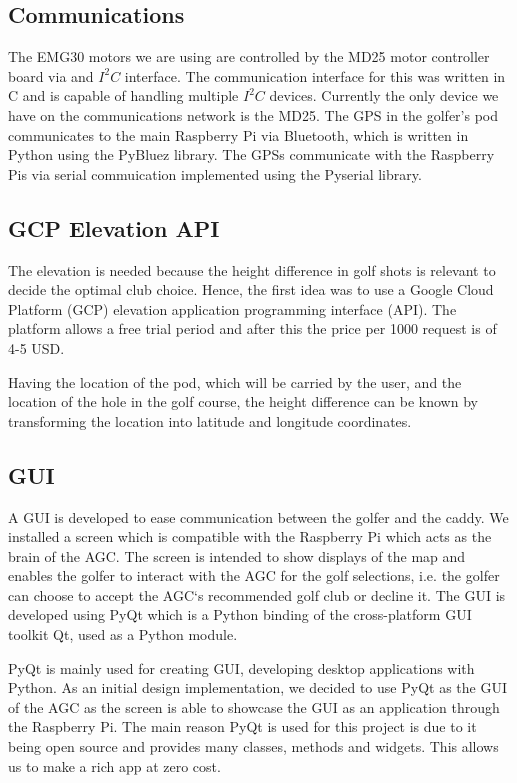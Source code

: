 \documentclass[11pt,landscape]{article}
\begin{document}
\begin{multicols}{3}

\subsection{Communications}
The EMG30 motors we are using are controlled by the MD25 motor controller board
via and $I^2C$ interface. The communication interface for this was written in C
and is capable of handling multiple $I^2C$ devices. Currently the only device we
have on the communications network is the MD25. The GPS in the golfer's pod communicates to the main Raspberry Pi via Bluetooth,
which is written in Python using the PyBluez library. The GPSs communicate with
the Raspberry Pis via serial commuication implemented using the Pyserial
library.

\subsection{GCP Elevation API}
The elevation is needed because the height difference in golf shots is relevant
to decide the optimal club choice. Hence, the first idea was to use a Google
Cloud Platform (GCP) elevation application programming interface (API). The
platform allows a free trial period and after this the price per 1000 request is
of 4-5 USD. 

Having the location of the pod, which will be carried by the user, and the
location of the hole in the golf course, the height difference can be known by
transforming the location into latitude and longitude coordinates.


\subsection{GUI}

A GUI is developed to ease communication between the golfer and the caddy. We
installed a screen which is compatible with the Raspberry Pi which acts as the
brain of the AGC. The screen is intended to show displays of the map and enables
the golfer to interact with the AGC for the golf selections, i.e. the golfer can
choose to accept the AGC`s recommended golf club or decline it. The GUI is
developed using PyQt which is a Python binding of the cross-platform GUI toolkit
Qt, used as a Python module. 

 

PyQt is mainly used for creating GUI, developing desktop applications with
Python. As an initial design implementation, we decided to use PyQt as the GUI
of the AGC as the screen is able to showcase the GUI as an application through
the Raspberry Pi. The main reason PyQt is used for this project is due to it
being open source and provides many classes, methods and widgets. This allows us
to make a rich app at zero cost.  


\end{multicols}
\end{document}
